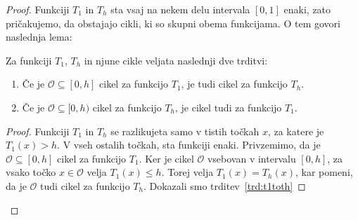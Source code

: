 \documentclass[mat2]{fmfdelo}
\begin{document}
\begin{proof}
Funkciji $T_1$ in $T_h$ sta vsaj na nekem delu intervala $[0, 1]$ enaki, zato pričakujemo, da obstajajo cikli, ki so skupni obema funkcijama. O tem govori naslednja lema:
\begin{lema}\label{lem:t1th}
Za funkciji $T_1$, $T_h$ in njune cikle  veljata naslednji dve trditvi:
\begin{enumerate}[label={(\arabic*)}]
\item Če je $\mathcal{O} \subseteq [0, h]$ cikel za funkcijo $T_1$, je tudi cikel za funkcijo $T_h$. \label{trd:t1toth}
\item Če je $\mathcal{O} \subseteq [0, h)$ cikel za funkcijo $T_h$, je cikel tudi za funkcijo $T_1$. \label{trd:thtot1}
\end{enumerate}
\end{lema}
\begin{proof}
Funkciji $T_1$ in $T_h$ se razlikujeta samo v tistih točkah $x$, za katere je $T_1(x) > h$. V vseh ostalih točkah, sta funkciji enaki. Privzemimo, da je $\mathcal{O} \subseteq [0, h]$ cikel za funkcijo $T_1$. Ker je cikel $\mathcal{O}$ vsebovan v intervalu $[0, h]$, za vsako točko $x \in \mathcal{O}$ velja $T_1(x) \leq h$. Torej velja $T_1(x)=T_h(x)$, kar pomeni, da je $\mathcal{O}$ tudi cikel za funkcijo $T_h$. Dokazali smo trditev~\ref{trd:t1toth}


\end{proof}
\end{proof}
\end{document}
